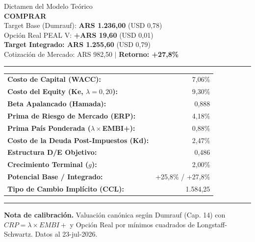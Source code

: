 \documentclass[10pt,a4paper]{article}
\begin{document}
\begin{minipage}[t]{0.42\textwidth}
    \vspace{-0.1cm}
    \begin{tcolorbox}[colback=white, colframe=gsnavy, boxrule=0.8pt, arc=3pt, left=4pt, right=4pt, top=3pt, bottom=3pt]
        \begin{center}
            {\scriptsize \color{gsgray} Dictamen del Modelo Teórico} \\[0.02cm]
            {\fontsize{15}{18}\selectfont \sffamily \textbf{\color{aluargreen} COMPRAR}} \\[0.05cm]
            {\scriptsize \color{gsgray} Target Base (Dumrauf): \textbf{ARS 1.236,00} (USD 0,78)} \\
            {\scriptsize \color{gsgray} Opción Real PEAL V: \textbf{+ARS 19,60} (USD 0,01)} \\
            {\small \color{gsnavy} \textbf{Target Integrado: ARS 1.255,60} (USD 0,79)} \\
            {\scriptsize \color{gsgray} Cotización de Mercado: ARS 982,50 $\mid$ \textbf{Retorno: +27,8\%}}
        \end{center}
        \vspace{0.04cm}
        \color{gsnavy}\rule{\textwidth}{0.4pt}
        \vspace{0.04cm}
        \scriptsize
        \begin{tabular}{@{}l@{\extracolsep{\fill}}r@{}}
            \textbf{Costo de Capital (WACC):} & 7,06\% \\
            \textbf{Costo del Equity (Ke, $\lambda = 0,20$):} & 9,30\% \\
            \textbf{Beta Apalancado (Hamada):} & 0,888 \\
            \textbf{Prima de Riesgo de Mercado (ERP):} & 4,18\% \\
            \textbf{Prima País Ponderada ($\lambda\times$EMBI+):} & 0,88\% \\
            \textbf{Costo de la Deuda Post-Impuestos (Kd):} & 2,47\% \\
            \textbf{Estructura D/E Objetivo:} & 0,486 \\
            \textbf{Crecimiento Terminal ($g$):} & 2,00\% \\
            \textbf{Potencial Base / Integrado:} & +25,8\% / +27,8\% \\
            \textbf{Tipo de Cambio Implícito (CCL):} & 1.584,25 \\
        \end{tabular}
        \vspace{0.04cm}
        \color{bordergray}\rule{\textwidth}{0.4pt}
        \vspace{0.03cm}
        {\tiny \color{gsgray} \textbf{Nota de calibración.} Valuación canónica según Dumrauf (Cap. 14) con $CRP = \lambda \times EMBI+$ y Opción Real por mínimos cuadrados de Longstaff-Schwartz. Datos al 23-jul-2026.\par}
    \end{tcolorbox}
\end{minipage}
\end{document}
